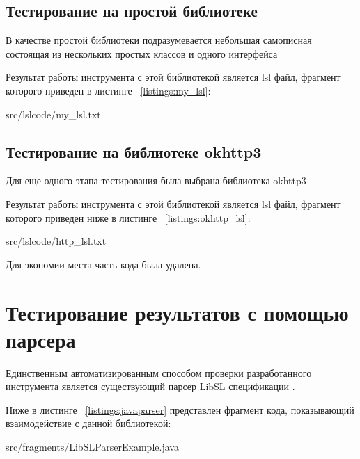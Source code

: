 \subsection{Тестирование на простой библиотеке}

В качестве простой библиотеки подразумевается небольшая самописная состоящая из нескольких простых классов и одного интерфейса

Результат работы инструмента с этой библиотекой является lsl файл, фрагмент которого приведен в листинге ~\ref{listings:my_lsl}:

{src/lslcode/my_lsl.txt}

\subsection{Тестирование на библиотеке okhttp3}

Для еще одного этапа тестирования была выбрана библиотека okhttp3

Результат работы инструмента с этой библиотекой является lsl файл, фрагмент которого приведен ниже в листинге ~\ref{listings:okhttp_lsl}:

{src/lslcode/http_lsl.txt}

Для экономии места часть кода была удалена.

\section{Тестирование результатов с помощью парсера}

Единственным автоматизированным способом проверки разработанного инструмента является существующий парсер LibSL спецификации \cite{libsl_parser}.

Ниже в листинге ~\ref{listings:javaparser} представлен фрагмент кода, показывающий взаимодействие с данной библиотекой:

{src/fragments/LibSLParserExample.java}

